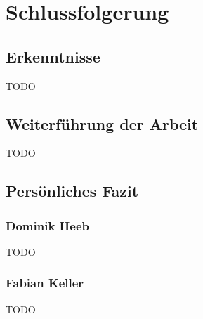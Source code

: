 
\chapter{Schlussfolgerung}
\section{Erkenntnisse}
TODO
\section{Weiterführung der Arbeit}
\begin{flushleft}
TODO
\end{flushleft}
\section{Persönliches Fazit}
\subsection{Dominik Heeb}
\begin{flushleft}
TODO
\end{flushleft}
\subsection{Fabian Keller}
\begin{flushleft}
TODO
\end{flushleft}